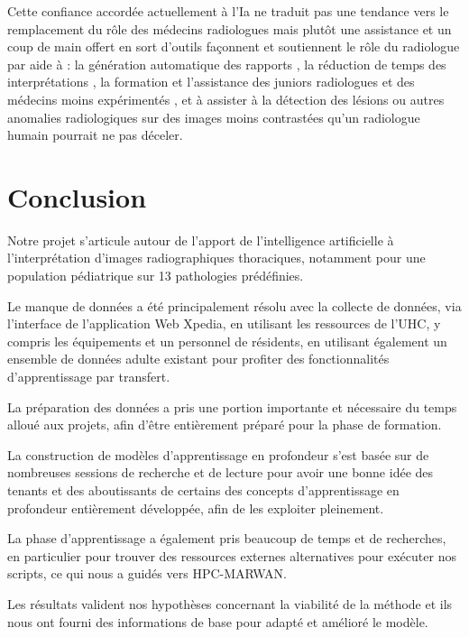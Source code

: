 \documentclass[12pt]{report}
\begin{document}
    Cette confiance accordée actuellement à l’Ia ne traduit pas une tendance vers le remplacement du rôle des médecins radiologues mais plutôt une assistance et un coup de main offert en sort d’outils façonnent et soutiennent le rôle du  radiologue par aide à : la génération automatique des rapports , la réduction de temps des interprétations , la formation et l’assistance des juniors radiologues et des médecins moins expérimentés , et à assister à la détection des lésions ou autres anomalies radiologiques sur des images moins contrastées qu’un radiologue humain pourrait ne pas déceler. 


    \label{general_project_context}
    
    
    

    \chapter*{Conclusion}
    Notre projet s'articule autour de l'apport de l'intelligence artificielle à l'interprétation d'images radiographiques thoraciques, notamment pour une population pédiatrique sur 13 pathologies prédéfinies.
    
    Le manque de données a été principalement résolu avec la collecte de données, via l'interface de l'application Web Xpedia, en utilisant les ressources de l'UHC, y compris les équipements et un personnel de résidents, en utilisant également un ensemble de données adulte existant pour profiter des fonctionnalités d'apprentissage par transfert.
    
    La préparation des données a pris une portion importante et nécessaire du temps alloué aux projets, afin d'être entièrement préparé pour la phase de formation.

    La construction de modèles d'apprentissage en profondeur s'est basée sur de nombreuses sessions de recherche et de lecture pour avoir une bonne idée des tenants et des aboutissants de certains des concepts d'apprentissage en profondeur entièrement développée, afin de les exploiter pleinement.

    La phase d'apprentissage a également pris beaucoup de temps et de recherches, en particulier pour trouver des ressources externes alternatives pour exécuter nos scripts, ce qui nous a guidés vers HPC-MARWAN.

    Les résultats valident nos hypothèses concernant la viabilité de la méthode et ils nous ont fourni des informations de base pour adapté et amélioré le modèle.
\end{document}
